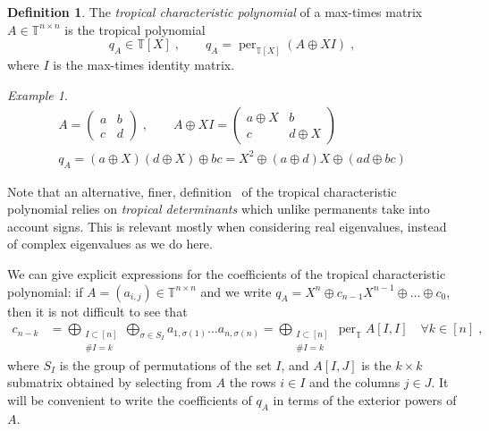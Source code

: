 \documentclass[a4paper]{amsart}
\theoremstyle{definition}
\newtheorem{defn}{Definition}
\theoremstyle{plain}
\theoremstyle{remark}
\newtheorem*{exa*}{Example}
\begin{document}
\begin{defn}
	The \emph{tropical characteristic polynomial} of a max-times matrix 
	${A \in {{\mathbb{T}}}^{n \times n}}$ is the tropical polynomial
	\[ q_A \in {{\mathbb{T}}}[X] \; , \qquad q_A = \operatorname{per}_{{{\mathbb{T}}}[X]} (A \oplus XI) \; ,\]
	where $I$ is the max-times identity matrix.
\end{defn}
\begin{exa*}
	\begin{align*}
	A = \begin{pmatrix} a & b \\ c & d \end{pmatrix}\;, \qquad
	A \oplus XI = \begin{pmatrix} a \oplus X & b \\ c & d \oplus X \end{pmatrix} \\
	q_A = (a \oplus X)(d \oplus X) \oplus bc = X^2 \oplus (a \oplus d)X \oplus (ad \oplus bc)
	\end{align*}
\end{exa*}
Note that an alternative, finer, definition~\cite{guterman}
of the tropical characteristic polynomial relies on {\em tropical determinants} which unlike permanents take into account signs.
This is relevant mostly when
considering real
eigenvalues, instead of complex
eigenvalues as we do here.

We can give explicit expressions for the coefficients of the tropical characteristic polynomial: if $A=(a_{i,j})\in {{\mathbb{T}}}^{n \times n}$ and we write 
$q_A = X^n \oplus c_{n-1}X^{n-1} \oplus \dots \oplus c_0$,
then it is not difficult to see that
\begin{align*}
	c_{n-k} &= \bigoplus_{\substack{I \subset [n] \\ {\# {I}} = k}} \bigoplus_{\sigma \in S_I} 
		a_{1, \sigma(1)} \dots a_{n,\sigma(n)}
= \bigoplus_{\substack{I \subset [n] \\ {\# {I}} = k}} \operatorname{per}_{{\mathbb{T}}} A[I,I]
\quad \forall k\in [n]\;,
\end{align*}
where $S_I$ is the group of permutations of the set $I$, and
$A[I,J]$ is the $k \times k$ submatrix obtained by selecting from $A$ the rows $i \in I$ and the columns $j \in J$.
It will be convenient to write the coefficients of $q_A$ in terms of the exterior powers of $A$.
\end{document}
